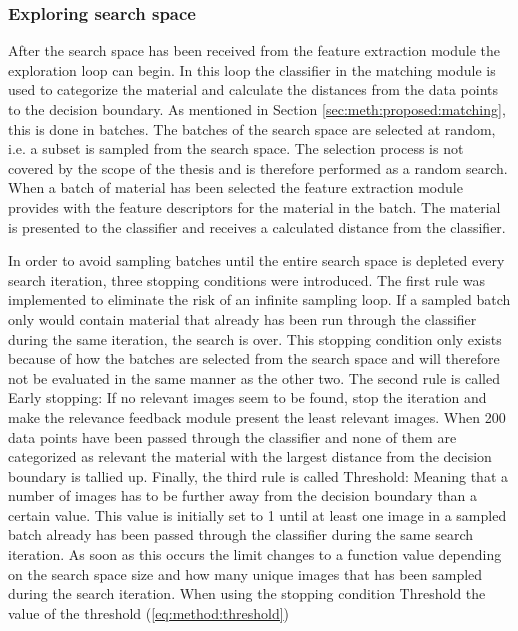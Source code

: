 \subsubsection{Exploring search space}
\label{sec:method:proposed:matching:search}
After the search space has been received from the feature extraction module the exploration loop can begin. In this loop the classifier in the matching module is used to categorize the material and calculate the distances from the data points to the decision boundary. As mentioned in Section \ref{sec:meth:proposed:matching}, this is done in batches. The batches of the search space are selected at random, i.e. a subset is sampled from the search space. The selection process is not covered by the scope of the thesis and is therefore performed as a random search. When a batch of material has been selected the feature extraction module provides with the feature descriptors for the material in the batch. The material is presented to the classifier and receives a calculated distance from the classifier. 

In order to avoid sampling batches until the entire search space is depleted every search iteration, three stopping conditions were introduced. The first rule was implemented to eliminate the risk of an infinite sampling loop. If a sampled batch only would contain material that already has been run through the classifier during the same iteration, the search is over. This stopping condition only exists because of how the batches are selected from the search space and will therefore not be evaluated in the same manner as the other two. The second rule is called Early stopping: If no relevant images seem to be found, stop the iteration and make the relevance feedback module present the least relevant images. When 200 data points have been passed through the classifier and none of them are categorized as relevant the material with the largest distance from the decision boundary is tallied up. Finally, the third rule is called Threshold: Meaning that a number of images has to be further away from the decision boundary than a certain value. This value is initially set to 1 until at least one image in a sampled batch already has been passed through the classifier during the same search iteration. As soon as this occurs the limit changes to a function value depending on the search space size and how many unique images that has been sampled during the search iteration. When using the stopping condition Threshold the value of the threshold (\ref{eq:method:threshold})

